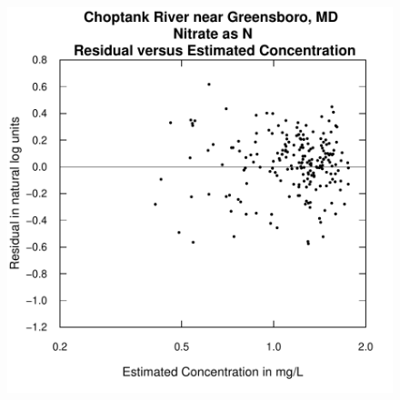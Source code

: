 \documentclass[a4paper,11pt]{article}
\begin{document}
\begin{figure}[htbp]
\begin{minipage}[h]{0.5\linewidth}
\begin{center}
\includegraphics{EGRET-figplotResidPred}
    \label{fig:plotResidPred}
    \end{center}
  \end{minipage}
  \caption{}
  \label{fig:plotLogFluxPredANDplotResidPred}
\end{figure}
\end{document}
